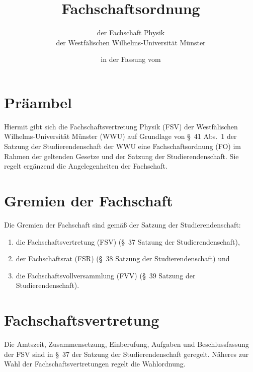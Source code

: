 


\pagestyle{scrheadings}

\title{Fachschaftsordnung}
\subtitle{der Fachschaft Physik\\
der Westfälischen Wilhelms-Universität Münster}
\date{in der Fassung vom }
\author{}



\maketitle

\section{Präambel}
Hiermit gibt sich die Fachschaftsvertretung Physik (FSV) der Westfälischen Wilhelms-Universi\-tät Münster (WWU) auf Grundlage von §~41 Abs.~1 der Satzung der Studierendenschaft der WWU eine Fachschaftsordnung (FO) im Rahmen der geltenden Gesetze und der Satzung der Studierendenschaft.
Sie regelt ergänzend die Angelegenheiten der Fachschaft.

\section{Gremien der Fachschaft}
Die Gremien der Fachschaft sind gemäß der Satzung der Studierendenschaft:
\begin{enumerate}
	\item die Fachschaftsvertretung (FSV) (§~37 Satzung der Studierendenschaft),
	\item der Fachschaftsrat (FSR) (§~38 Satzung der Studierendenschaft) und 
	\item die Fachschaftsvollversammlung (FVV) (§~39 Satzung der Studierendenschaft).
\end{enumerate}

\section{Fachschaftsvertretung}
Die Amtszeit, Zusammensetzung, Einberufung, Aufgaben und Beschlussfassung der FSV sind in §~37 der Satzung der Studierendenschaft geregelt.
Näheres zur Wahl der Fachschaftsvertretungen regelt die Wahlordnung.

